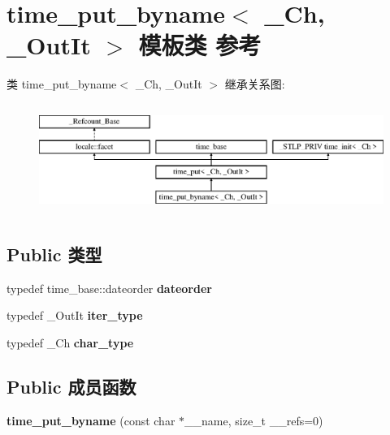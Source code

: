 \hypertarget{classtime__put__byname}{}\section{time\+\_\+put\+\_\+byname$<$ \+\_\+\+Ch, \+\_\+\+Out\+It $>$ 模板类 参考}
\label{classtime__put__byname}
类 time\+\_\+put\+\_\+byname$<$ \+\_\+\+Ch, \+\_\+\+Out\+It $>$ 继承关系图\+:\begin{figure}[H]
\begin{center}
\leavevmode
\includegraphics[height=3.624595cm]{classtime__put__byname}
\end{center}
\end{figure}
\subsection*{Public 类型}
\begin{DoxyCompactItemize}
\item 
\mbox{\label{classtime__put__byname_a4a6e528123d911d11deae5a6dd38f3ea}} 
typedef time\+\_\+base\+::dateorder {\bfseries dateorder}
\item 
\mbox{\label{classtime__put__byname_a6e945cf01952fd40ffbbd9f489e07983}} 
typedef \+\_\+\+Out\+It {\bfseries iter\+\_\+type}
\item 
\mbox{\label{classtime__put__byname_afc3b25fec0c1d6356adf57032bc7f7a4}} 
typedef \+\_\+\+Ch {\bfseries char\+\_\+type}
\end{DoxyCompactItemize}
\subsection*{Public 成员函数}
\begin{DoxyCompactItemize}
\item 
\mbox{\label{classtime__put__byname_a63bbced86e0538800eccb8b92c5d1d66}} 
{\bfseries time\+\_\+put\+\_\+byname} (const char $\ast$\+\_\+\+\_\+name, size\+\_\+t \+\_\+\+\_\+refs=0)
\end{DoxyCompactItemize}
